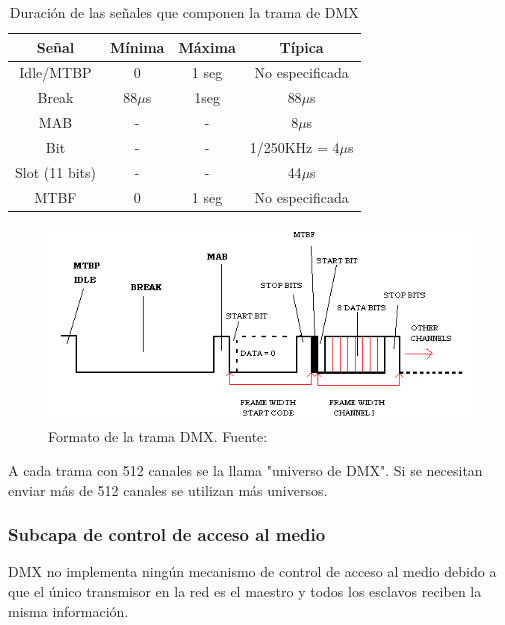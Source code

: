 \begin{table}[!ht]
	\begin{center}
		\begin{tabular}{|c|c|c|c|}
			\hline
			\rowcolor{OODlightblue}
			\textbf{Señal} & \textbf{Mínima} & \textbf{Máxima} & \textbf{Típica} \\
			\hline \hline
			Idle/MTBP & 0 & 1 seg & No especificada \\
			Break & 88\(\mu \)s & 1seg & 88\(\mu \)s\\
			MAB & - & - & 8\(\mu \)s \\
			Bit & - & - & 1/250KHz = 4\(\mu \)s \\
			Slot (11 bits) & - & - & 44\(\mu \)s \\
			MTBF & 0 & 1 seg & No especificada \\
			\hline
		\end{tabular}
	\end{center}
	\caption{Duración de las señales que componen la trama de DMX}
	\label{table:\thetable}
\end{table}

\begin{figure}[!ht]
	\centering
	\includegraphics[width=15cm,scale=1]{resources/1_8-tramaDMX.png}
	\caption{Formato de la trama DMX. Fuente: \cite{fig1_8}}
	\label{fig:\thefigure}
\end{figure}

A cada trama con 512 canales se la llama "universo de DMX". Si se necesitan enviar más de 512 canales se utilizan más universos.

\subsubsection{Subcapa de control de acceso al medio}
DMX no implementa ningún mecanismo de control de acceso al medio debido a que el único transmisor en la red es el maestro y todos los esclavos reciben la misma información.

